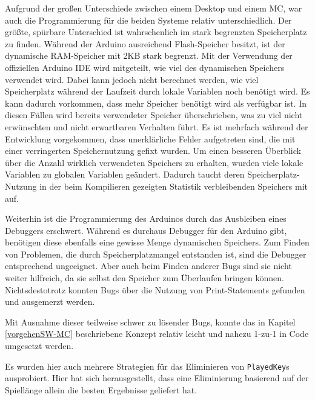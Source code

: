 Aufgrund der großen Unterschiede zwischen einem Desktop und einem \ac{MC}, war auch die Programmierung für die beiden Systeme relativ unterschiedlich.
Der größte, spürbare Unterschied ist wahrschenlich im stark begrenzten Speicherplatz zu finden.
Während der Arduino ausreichend Flash-Speicher besitzt, ist der dynamische RAM-Speicher mit 2KB stark begrenzt.
Mit der Verwendung der offiziellen Arduino IDE wird mitgeteilt, wie viel des dynamischen Speichers verwendet wird.
Dabei kann jedoch nicht berechnet werden, wie viel Speicherplatz während der Laufzeit durch lokale Variablen noch benötigt wird.
Es kann dadurch vorkommen, dass mehr Speicher benötigt wird als verfügbar ist.
In diesen Fällen wird bereits verwendeter Speicher überschrieben, was zu viel nicht erwünschten und nicht erwartbaren Verhalten führt.
Es ist mehrfach während der Entwicklung vorgekommen, dass unerklärliche Fehler aufgetreten sind, die mit einer verringerten Speichernutzung gefixt wurden.
Um einen besseren Überblick über die Anzahl wirklich verwendeten Speichers zu erhalten, wurden viele lokale Variablen zu globalen Variablen geändert.
Dadurch taucht deren Speicherplatz-Nutzung in der beim Kompilieren gezeigten Statistik verbleibenden Speichers mit auf.

Weiterhin ist die Programmierung des Arduinos durch das Ausbleiben eines Debuggers erschwert.
Während es durchaus Debugger für den Arduino gibt, benötigen diese ebenfalls eine gewisse Menge dynamischen Speichers.
Zum Finden von Problemen, die durch Speicherplatzmangel entstanden ist, sind die Debugger entsprechend ungeeignet.
Aber auch beim Finden anderer Bugs sind sie nicht weiter hilfreich, da sie selbst den Speicher zum Überlaufen bringen können.
Nichtsdestotrotz konnten Bugs über die Nutzung von Print-Statements gefunden und ausgemerzt werden.

Mit Ausnahme dieser teilweise schwer zu lösender Bugs, konnte das in Kapitel \ref{vorgehenSW-MC} beschriebene Konzept relativ leicht und nahezu 1-zu-1 in Code umgesetzt werden.

Es wurden hier auch mehrere Strategien für das Eliminieren von \lstinline|PlayedKey|s ausprobiert.
Hier hat sich herausgestellt, dass eine Eliminierung basierend auf der Spiellänge allein die besten Ergebnisse geliefert hat.
